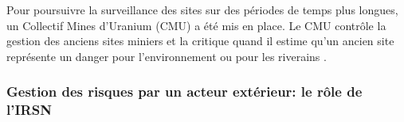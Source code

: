 \documentclass{article}
\begin{document}
Pour poursuivre la surveillance des sites sur des périodes de temps plus longues, un Collectif Mines d’Uranium (CMU) a été mis en place. Le CMU contrôle la gestion des anciens sites miniers et la critique quand il estime qu'un ancien site représente un danger pour l'environnement ou pour les riverains \cite{noauthor_collectif_nodate}.



\subsubsection{Gestion des risques par un acteur extérieur: le rôle de l’IRSN}
\end{document}
